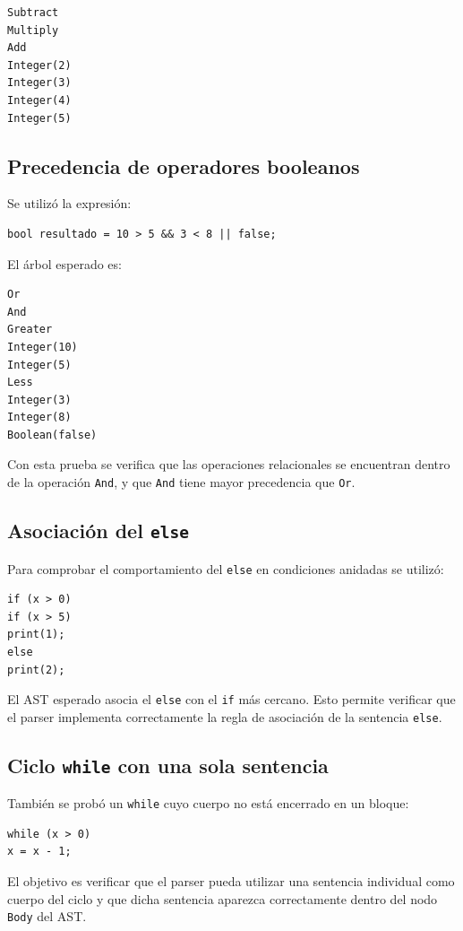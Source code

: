 \documentclass[12pt,letterpaper]{article}
\begin{document}
\begin{verbatim}
Subtract
Multiply
Add
Integer(2)
Integer(3)
Integer(4)
Integer(5)
\end{verbatim}

\subsection*{Precedencia de operadores booleanos}

Se utilizó la expresión:

\begin{verbatim}
bool resultado = 10 > 5 && 3 < 8 || false;
\end{verbatim}

El árbol esperado es:

\begin{verbatim}
Or
And
Greater
Integer(10)
Integer(5)
Less
Integer(3)
Integer(8)
Boolean(false)
\end{verbatim}

Con esta prueba se verifica que las operaciones relacionales se encuentran dentro de la operación \texttt{And}, y que \texttt{And} tiene mayor precedencia que \texttt{Or}.

\subsection*{Asociación del \texttt{else}}

Para comprobar el comportamiento del \texttt{else} en condiciones anidadas se utilizó:

\begin{verbatim}
if (x > 0)
if (x > 5)
print(1);
else
print(2);
\end{verbatim}

El AST esperado asocia el \texttt{else} con el \texttt{if} más cercano. Esto permite verificar que el parser implementa correctamente la regla de asociación de la sentencia \texttt{else}.

\subsection*{Ciclo \texttt{while} con una sola sentencia}

También se probó un \texttt{while} cuyo cuerpo no está encerrado en un bloque:

\begin{verbatim}
while (x > 0)
x = x - 1;
\end{verbatim}

El objetivo es verificar que el parser pueda utilizar una sentencia individual como cuerpo del ciclo y que dicha sentencia aparezca correctamente dentro del nodo \texttt{Body} del AST.
\end{document}

